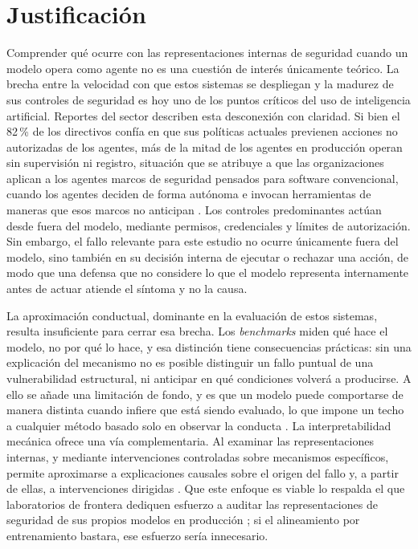 \documentclass[12pt,a4paper]{article}
\newcommand{\parencite}[1]{\citep{#1}}
\begin{document}
\section{Justificación}

\justifying

Comprender qué ocurre con las representaciones internas de seguridad cuando un modelo opera como agente no es una cuestión de interés únicamente teórico. La brecha entre la velocidad con que estos sistemas se despliegan y la madurez de sus controles de seguridad es hoy uno de los puntos críticos del uso de inteligencia artificial. Reportes del sector describen esta desconexión con claridad. Si bien el 82\,\% de los directivos confía en que sus políticas actuales previenen acciones no autorizadas de los agentes, más de la mitad de los agentes en producción operan sin supervisión ni registro, situación que se atribuye a que las organizaciones aplican a los agentes marcos de seguridad pensados para software convencional, cuando los agentes deciden de forma autónoma e invocan herramientas de maneras que esos marcos no anticipan \parencite{gravitee2026}. Los controles predominantes actúan desde fuera del modelo, mediante permisos, credenciales y límites de autorización. Sin embargo, el fallo relevante para este estudio no ocurre únicamente fuera del modelo, sino también en su decisión interna de ejecutar o rechazar una acción, de modo que una defensa que no considere lo que el modelo representa internamente antes de actuar atiende el síntoma y no la causa.

La aproximación conductual, dominante en la evaluación de estos sistemas, resulta insuficiente para cerrar esa brecha. Los \textit{benchmarks} miden qué hace el modelo, no por qué lo hace, y esa distinción tiene consecuencias prácticas: sin una explicación del mecanismo no es posible distinguir un fallo puntual de una vulnerabilidad estructural, ni anticipar en qué condiciones volverá a producirse. A ello se añade una limitación de fondo, y es que un modelo puede comportarse de manera distinta cuando infiere que está siendo evaluado, lo que impone un techo a cualquier método basado solo en observar la conducta \parencite{greenblatt2024}. La interpretabilidad mecánica ofrece una vía complementaria. Al examinar las representaciones internas, y mediante intervenciones controladas sobre mecanismos específicos, permite aproximarse a explicaciones causales sobre el origen del fallo y, a partir de ellas, a intervenciones dirigidas \parencite{arditi2024}. Que este enfoque es viable lo respalda el que laboratorios de frontera dediquen esfuerzo a auditar las representaciones de seguridad de sus propios modelos en producción \parencite{templeton2024}; si el alineamiento por entrenamiento bastara, ese esfuerzo sería innecesario.
\end{document}
